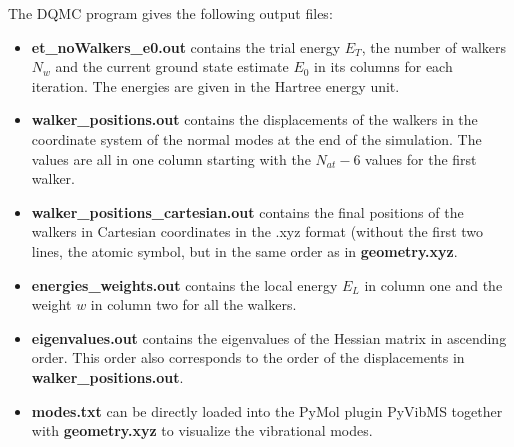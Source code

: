 \documentclass [12pt]{report}
\begin{document}
\begin{appendices}
The DQMC program gives the following output files:
\begin{itemize}
\item \textbf{et\_noWalkers\_e0.out} contains the trial energy $E_T$, the number of walkers $N_w$ and the current ground state estimate $E_0$ in its columns for each iteration. The energies are given in the Hartree energy unit.
\item \textbf{walker\_positions.out} contains the displacements of the walkers in the coordinate system of the normal modes at the end of the simulation. The values are all in one column starting with the $N_{at}-6$ values for the first walker.
\item \textbf{walker\_positions\_cartesian.out} contains the final positions of the walkers in Cartesian coordinates in the .xyz format (without the first two lines, the atomic symbol, but in the same order as in \textbf{geometry.xyz}.
\item \textbf{energies\_weights.out} contains the local energy $E_L$ in column one and the weight $w$ in column two for all the walkers.
\item \textbf{eigenvalues.out} contains the eigenvalues of the Hessian matrix in ascending order. This order also corresponds to the order of the displacements in \textbf{walker\_positions.out}.
\item \textbf{modes.txt} can be directly loaded into the PyMol plugin PyVibMS \cite{PyVibMS} together with \textbf{geometry.xyz} to visualize the vibrational modes.
\end{itemize}

\end{appendices}



\end{document}
